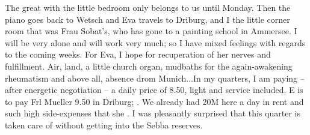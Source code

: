 
The great  with the little bedroom only belongs to us until Monday. Then the piano goes back to Wetsch and Eva travels to Driburg, and I the little corner room that was Frau Sobat's, who has gone to a painting school in Ammersee. I will be very alone and will work very much; so I have mixed feelings with regards to the coming weeks. For Eva, I hope for recuperation of her nerves and fulfillment. Air, land, a little church organ, mudbaths for the again-awakening rheumatism and above all, absence drom Munich...In my quarters, I am paying -- after energetic negotiation -- a daily price of 8.50, light and service included. E is to pay Frl Mueller 9.50 in Driburg; . We already had 20M here a day in rent and such high side-expenses that she . I was pleasantly surprised that this quarter is taken care of without getting into the Sebba reserves.

\missing

